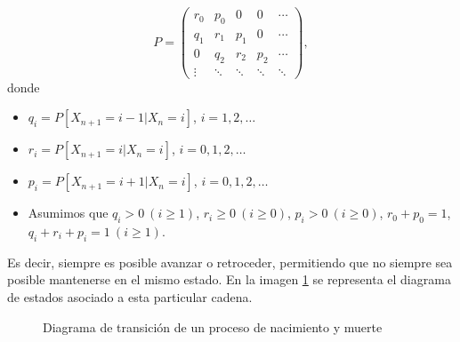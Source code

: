 \begin{equation}
    \label{eq:matriz-pnm}
    P = \begin{pmatrix}
        r_0 & p_0 & 0 & 0 & \cdots \\
        q_1 & r_1 & p_1 & 0 & \cdots \\
        0 & q_2 & r_2 & p_2 & \cdots \\
        \vdots & \ddots & \ddots & \ddots & \ddots 
    \end{pmatrix},
\end{equation}
donde
\begin{itemize}
    \item $q_i = P[X_{n+1}=i-1|X_n=i]$, $i=1,2,\dots$
    \item $r_i = P[X_{n+1}=i|X_n=i]$, $i=0,1,2,\dots$
    \item $p_i = P[X_{n+1}=i+1|X_n=i]$, $i=0,1,2,\dots$
    \item Asumimos que $q_i > 0 \ (i\geq 1)$, $r_i\geq 0 \  (i\geq 0)$, $p_i>0 \ (i\geq 0)$, $r_0+p_0 =1$, $q_i+r_i+p_i=1 \ (i\geq 1)$.
\end{itemize}

Es decir, siempre es posible avanzar o retroceder, permitiendo que no siempre sea posible mantenerse en el mismo estado. En la imagen \ref{img:diagrama-trans-pnm} se representa el diagrama de estados asociado a esta particular cadena.

\begin{figure}[ht] 
    \label{img:diagrama-trans-pnm}
    \centering 
    \caption{Diagrama de transición de un proceso de nacimiento y muerte}
    \end{figure}


